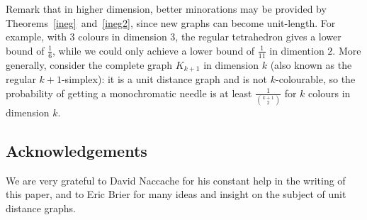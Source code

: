 \documentclass[a4paper,11pt]{article}
\theoremstyle{definition}
\theoremstyle{remark}
\begin{document}
Remark that in higher dimension, better minorations may be provided by 
Theorems~\ref{ineg}~and~\ref{ineg2}, since new graphs can 
become unit-length. For example, with $3$ colours in dimension $3$, the regular 
tetrahedron gives a lower bound 
of $\frac 1 6$, while we could only achieve a lower bound of $\frac 1 {11}$ in dimention $2$. More generally, consider the complete graph 
$K_{k+1}$ in dimension $k$ (also known as the regular $k+1$-simplex): it is a unit distance graph and is not $k$-colourable, so the 
probability of getting a monochromatic needle is at least $\frac{1}{\binom{k+1}{2}}$ 
for $k$ colours in dimension $k$.

\subsection*{Acknowledgements}
We are very grateful to David Naccache for his constant help in the writing of
this paper, and to Eric Brier for many ideas and insight on the subject of 
unit distance graphs.



\end{document}
